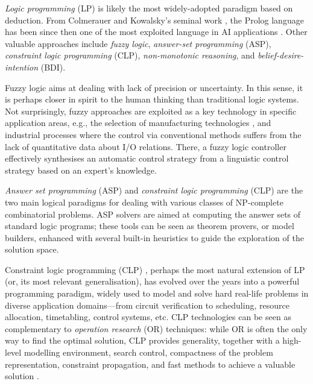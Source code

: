 \documentclass[12pt,a4paper,openright,twoside]{book}
\begin{document}
\emph{Logic programming} (LP) is likely the most widely-adopted paradigm based on deduction.
%
From Colmerauer and Kowalsky's seminal work \cite{Kowalski1974,colmerauer1986-theoreticalProlog}, the Prolog language has been since then one of the most exploited language in AI applications \cite{Dawson1996}.
%
Other valuable approaches include \emph{fuzzy logic}, \emph{answer-set programming} (ASP), \emph{constraint logic programming} (CLP), \emph{non-monotonic reasoning}, and \emph{belief-desire-intention} (BDI).

Fuzzy logic \cite{yen1999} aims at dealing with lack of precision or uncertainty.
%
In this sense, it is perhaps closer in spirit to the human thinking than traditional logic systems.
%
Not surprisingly, fuzzy approaches are exploited as a key technology in specific application areas, e.g., the selection of manufacturing technologies \cite{goyal2012}, and industrial processes where the control via conventional methods suffers from the lack of quantitative data about I/O relations.
%
There, a fuzzy logic controller effectively synthesises an automatic control strategy from a linguistic control strategy based on an expert's knowledge.

\emph{Answer set programming} (ASP) and \emph{constraint logic programming} (CLP) are the two main logical paradigms for dealing with various classes of NP-complete combinatorial problems.
%
ASP solvers are aimed at computing the answer sets of standard logic programs; these tools can be seen as theorem provers, or model builders, enhanced with several built-in heuristics to guide the exploration of the solution space.
%

Constraint logic programming (CLP) \cite{jaffar1987}, perhaps the most natural extension of LP (or, its most relevant generalisation), has evolved over the years into a powerful programming paradigm, widely used to model and solve hard real-life problems \cite{Rossi2000} in diverse application domains---from circuit verification to scheduling, resource allocation, timetabling, control systems, etc.
%
CLP technologies can be seen as complementary to \emph{operation research} (OR) techniques: while OR is often the only way to find the optimal solution, CLP provides generality, together with a high-level modelling environment, search control, compactness of the problem representation, constraint propagation, and fast methods to achieve a valuable solution \cite{rossi2008}.
%
\end{document}
